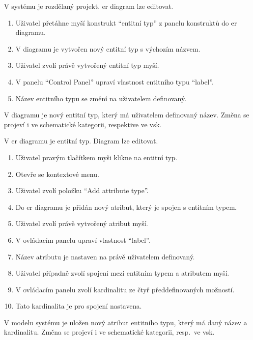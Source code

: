 \ucstart{}
V systému je rozdělaný projekt.
\acrshort{er} diagram lze editovat.

\ucnormal{}
\begin{enumerate}
  \item Uživatel přetáhne myší konstrukt \enquote{entitní typ} z panelu konstruktů do \acrshort{er} diagramu.
  \item V diagramu je vytvořen nový entitní typ s výchozím názvem.
  \item Uživatel zvolí právě vytvořený entitní typ myší.
  \item V panelu \enquote{Control Panel} upraví vlastnost entitního typu \enquote{label}.
  \item Název entitního typu se změní na uživatelem definovaný.
\end{enumerate}

\ucend{}
V diagramu je nový entitní typ, který má uživatelem definovaný název.
Změna se projeví i ve schematické kategorii, respektive ve \acrshort{vsk}.

\ucstart{}
V \acrshort{er} diagramu je entitní typ. Diagram lze editovat.

\ucnormal{}
\begin{enumerate}
  \item Uživatel pravým tlačítkem myši klikne na entitní typ.
  \item Otevře se kontextové menu.
  \item Uživatel zvolí položku \enquote{Add attribute type}.
  \item Do \acrshort{er} diagramu je přidán nový atribut, který je spojen s entitním typem.
  \item Uživatel zvolí právě vytvořený atribut myší.
  \item V ovládacím panelu upraví vlastnost \enquote{label}.
  \item Název atributu je nastaven na právě uživatelem definovaný.
  \item Uživatel případně zvolí spojení mezi entitním typem a atributem myší.
  \item V ovládacím panelu zvolí kardinalitu ze čtyř předdefinovaných možností.
  \item Tato kardinalita je pro spojení nastavena.
\end{enumerate}

\ucend{}
V modelu systému je uložen nový atribut entitního typu, který má daný název a kardinalitu.
Změna se projeví i ve schematické kategorii, resp.~ve \acrshort{vsk}.

